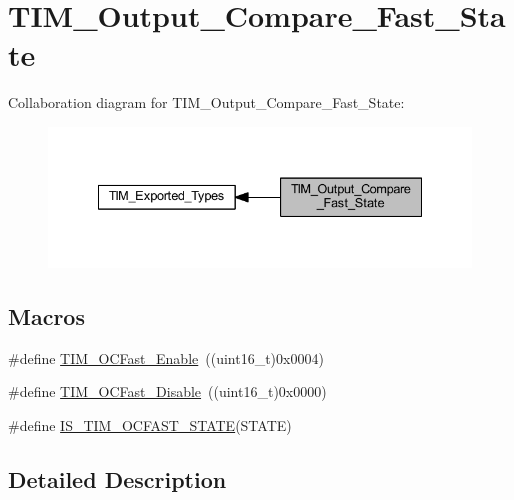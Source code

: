 \hypertarget{group___t_i_m___output___compare___fast___state}{}\section{T\+I\+M\+\_\+\+Output\+\_\+\+Compare\+\_\+\+Fast\+\_\+\+State}
\label{group___t_i_m___output___compare___fast___state}
Collaboration diagram for T\+I\+M\+\_\+\+Output\+\_\+\+Compare\+\_\+\+Fast\+\_\+\+State\+:
\nopagebreak
\begin{figure}[H]
\begin{center}
\leavevmode
\includegraphics[width=335pt]{group___t_i_m___output___compare___fast___state}
\end{center}
\end{figure}
\subsection*{Macros}
\begin{DoxyCompactItemize}
\item 
\#define \hyperlink{group___t_i_m___output___compare___fast___state_ga0cfb598c985363ee7004e52c97c524a3}{T\+I\+M\+\_\+\+O\+C\+Fast\+\_\+\+Enable}~((uint16\+\_\+t)0x0004)
\item 
\#define \hyperlink{group___t_i_m___output___compare___fast___state_gab3d39f8797953cb58754205169d8278e}{T\+I\+M\+\_\+\+O\+C\+Fast\+\_\+\+Disable}~((uint16\+\_\+t)0x0000)
\item 
\#define \hyperlink{group___t_i_m___output___compare___fast___state_ga65ad85cb4ba48660e8f519a1f6c298d2}{I\+S\+\_\+\+T\+I\+M\+\_\+\+O\+C\+F\+A\+S\+T\+\_\+\+S\+T\+A\+TE}(S\+T\+A\+TE)
\end{DoxyCompactItemize}


\subsection{Detailed Description}


